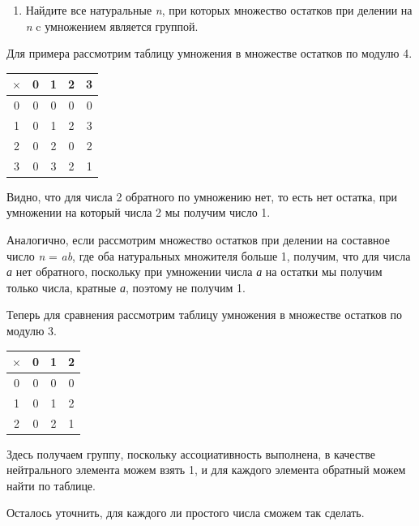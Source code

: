 \documentclass[12pt]{article}
\begin{document}
    \begin{enumerate}
        \def\labelenumi{\arabic{enumi}.}
        \item
              Найдите все натуральные \emph{n}, при которых множество остатков при
              делении на \emph{n} c умножением является группой.
    \end{enumerate}

    Для примера рассмотрим таблицу умножения в множестве остатков по модулю
    4.

    \begin{tabular}{|c|c|c|c|c|}
        \hline
        $\times$ & 0 & 1 & 2 & 3 \\
        \hline
        0        & 0 & 0 & 0 & 0 \\
        \hline
        1        & 0 & 1 & 2 & 3 \\
        \hline
        2        & 0 & 2 & 0 & 2 \\
        \hline
        3        & 0 & 3 & 2 & 1 \\
        \hline
    \end{tabular}

    Видно, что для числа 2 обратного по умножению нет, то есть нет остатка,
    при умножении на который числа 2 мы получим число 1.

    Аналогично, если рассмотрим множество остатков при делении на составное
    число \emph{n} = \emph{ab}, где оба натуральных множителя больше 1,
    получим, что для числа \emph{а} нет обратного, поскольку при умножении
    числа \emph{а} на остатки мы получим только числа, кратные \emph{а},
    поэтому не получим 1.

    Теперь для сравнения рассмотрим таблицу умножения в множестве остатков
    по модулю 3.

    \begin{tabular}{|c|c|c|c|}
        \hline
        $\times$ & 0 & 1 & 2 \\
        \hline
        0        & 0 & 0 & 0 \\
        \hline
        1        & 0 & 1 & 2 \\
        \hline
        2        & 0 & 2 & 1 \\
        \hline
    \end{tabular}

    Здесь получаем группу, поскольку ассоциативность выполнена, в качестве
    нейтрального элемента можем взять 1, и для каждого элемента обратный
    можем найти по таблице.

    Осталось уточнить, для каждого ли простого числа сможем так сделать.
\end{document}

